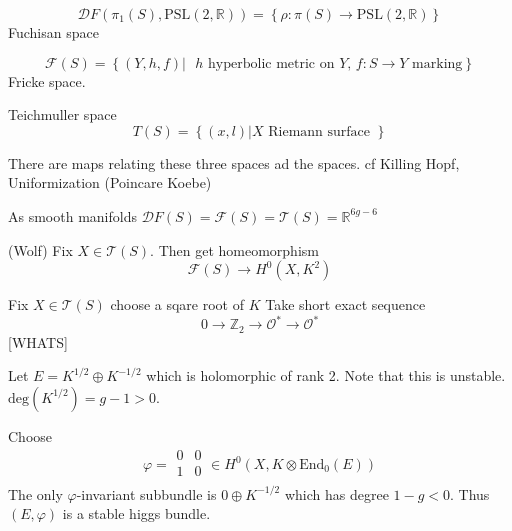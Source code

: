 \begin{equation}
    \mathcal{D} F ( \pi_1 ( S) , \mathrm{PSL} (2, \mathbb{R} ) ) =
    \left \{ \rho : \pi ( S)  \rightarrow  \mathrm{PSL} ( 2, \mathbb{R} ) \right\}
\end{equation}
Fuchisan space 

\begin{equation}
    \mathcal{F} ( S)  = \left\{ ( Y, h, f) | \mbox{ $h$ hyperbolic metric on $Y$, $f:S \rightarrow Y$ marking} \right \} 
\end{equation}
Fricke space. 

Teichmuller space 
\begin{equation}
     T(S)  = \left\{ ( x, l ) | X \mbox{ Riemann surface } \right \} 
\end{equation}

There are maps relating these three spaces ad the spaces. 
cf Killing Hopf, Uniformization (Poincare Koebe) 


\begin{theorem}
As smooth manifolds $ \mathcal{D} F (S) = \mathcal{F} (S) = \mathcal{T} (S) = \mathbb{R}  ^{ 6g-6} $
\end{theorem}

\begin{theorem}
 (Wolf) 
    Fix $ X \in \mathcal{T} (S) $. 
    Then get homeomorphism 
    \begin{equation}
        \mathcal{F} (S) \rightarrow H^0 (X, K^2) 
    \end{equation}
\end{theorem}

Fix $ X \in \mathcal{T} ( S) $ choose a sqare root of $ K$ 
Take short exact sequence
\begin{equation}
    0 \rightarrow  \mathbb{Z} _2 \rightarrow \mathcal{O}^* \rightarrow \mathcal{O}^* 
\end{equation}
[WHATS]

Let $ E = K^{1/2} \oplus K^{-1/2}$ which is holomorphic of rank 2. 
Note that this is unstable.
$ \mathrm{deg} ( K^{1/2} ) = g -1  > 0 $. 

Choose 
\begin{equation}
    \varphi = \begin{array}{rr}
        0 & 0 \\
        1 & 0 \\
    \end{array} \in H^0 ( X, K \otimes \mathrm{End}_ 0 ( E))
\end{equation}
The only $ \varphi$-invariant subbundle is $ 0 \oplus K^{-1/2} $ 
which has degree $ 1-g < 0 $. 
Thus $ ( E, \varphi ) $ is a stable higgs bundle. 

